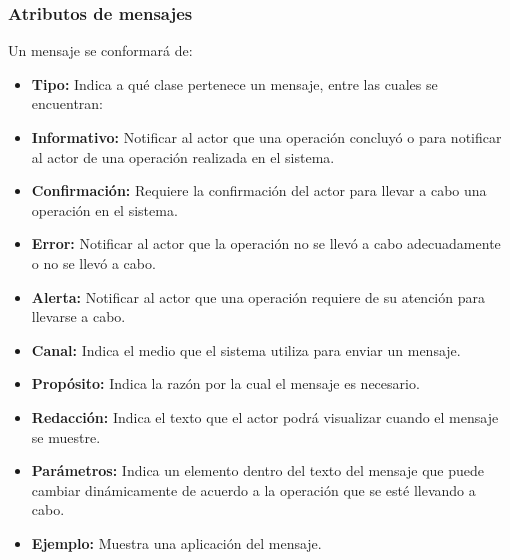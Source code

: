 %

\subsubsection{Atributos de mensajes}

Un mensaje se conformará de:
\begin{itemize}
	\item \textbf{Tipo:} Indica a qué clase pertenece un mensaje, entre las cuales se 
	encuentran:
	\item \textbf{Informativo:} Notificar al actor que una operación concluyó o para 
	notificar al actor de una operación realizada en el sistema.
	\item \textbf{Confirmación:} Requiere la confirmación del actor para llevar a 
	cabo una operación en el sistema.
	\item \textbf{Error:} Notificar al actor que la operación no se llevó a cabo 
	adecuadamente o no se llevó a cabo.
	\item \textbf{Alerta:} Notificar al actor que una operación requiere de su 
	atención para llevarse a cabo.
	\item \textbf{Canal:} Indica el medio que el sistema utiliza para enviar un 
	mensaje.
	\item \textbf{Propósito:} Indica la razón por la cual el mensaje es necesario.
	\item \textbf{Redacción:} Indica el texto que el actor podrá visualizar cuando el 
	mensaje se muestre.
	\item \textbf{Parámetros:} Indica un elemento dentro del texto del mensaje que 
	puede cambiar dinámicamente de acuerdo a la operación que se esté 
	llevando a cabo.
	\item \textbf{Ejemplo:} Muestra una aplicación del mensaje.
\end{itemize}

